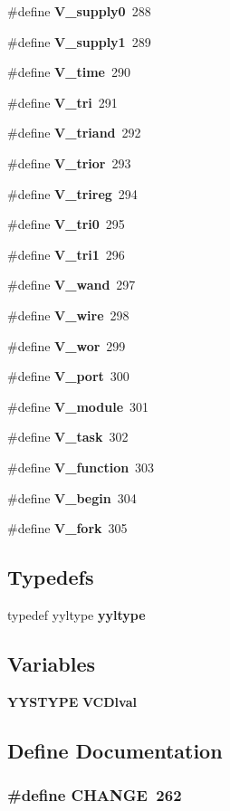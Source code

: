 \begin{CompactItemize}
\item 
\#define {\bf V\_\-supply0}\ 288
\item 
\#define {\bf V\_\-supply1}\ 289
\item 
\#define {\bf V\_\-time}\ 290
\item 
\#define {\bf V\_\-tri}\ 291
\item 
\#define {\bf V\_\-triand}\ 292
\item 
\#define {\bf V\_\-trior}\ 293
\item 
\#define {\bf V\_\-trireg}\ 294
\item 
\#define {\bf V\_\-tri0}\ 295
\item 
\#define {\bf V\_\-tri1}\ 296
\item 
\#define {\bf V\_\-wand}\ 297
\item 
\#define {\bf V\_\-wire}\ 298
\item 
\#define {\bf V\_\-wor}\ 299
\item 
\#define {\bf V\_\-port}\ 300
\item 
\#define {\bf V\_\-module}\ 301
\item 
\#define {\bf V\_\-task}\ 302
\item 
\#define {\bf V\_\-function}\ 303
\item 
\#define {\bf V\_\-begin}\ 304
\item 
\#define {\bf V\_\-fork}\ 305
\end{CompactItemize}
\subsection*{Typedefs}
\begin{CompactItemize}
\item 
typedef yyltype {\bf yyltype}
\end{CompactItemize}
\subsection*{Variables}
\begin{CompactItemize}
\item 
{\bf YYSTYPE} {\bf VCDlval}
\end{CompactItemize}


\subsection{Define Documentation}
\subsubsection{\setlength{\rightskip}{0pt plus 5cm}\#define CHANGE\ 262}\label{vcd__parser_8h_a6}


